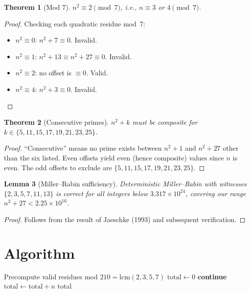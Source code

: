 \documentclass[12pt]{article}
\newtheorem{theorem}{Theorem}
\newtheorem{lemma}[theorem]{Lemma}
\begin{document}
\begin{theorem}[Mod 7]
$n^2 \equiv 2 \pmod{7}$, i.e., $n \equiv 3$ or $4 \pmod{7}$.
\end{theorem}

\begin{proof}
Checking each quadratic residue mod~7:
\begin{itemize}
\item $n^2 \equiv 0$: $n^2+7 \equiv 0$. Invalid.
\item $n^2 \equiv 1$: $n^2+13 \equiv n^2+27 \equiv 0$. Invalid.
\item $n^2 \equiv 2$: no offset is $\equiv 0$. Valid.
\item $n^2 \equiv 4$: $n^2+3 \equiv 0$. Invalid.
\end{itemize}
\end{proof}

\begin{theorem}[Consecutive primes]
$n^2+k$ must be composite for $k \in \{5,11,15,17,19,21,23,25\}$.
\end{theorem}

\begin{proof}
``Consecutive'' means no prime exists between $n^2+1$ and $n^2+27$ other than the six listed. Even offsets yield even (hence composite) values since $n$ is even. The odd offsets to exclude are $\{5,11,15,17,19,21,23,25\}$.
\end{proof}

\begin{lemma}[Miller--Rabin sufficiency]
Deterministic Miller--Rabin with witnesses $\{2,3,5,7,11,13\}$ is correct for all integers below $3.317 \times 10^{24}$, covering our range $n^2+27 < 2.25 \times 10^{16}$.
\end{lemma}

\begin{proof}
Follows from the result of Jaeschke (1993) and subsequent verification.
\end{proof}

\section{Algorithm}

\begin{algorithmic}[1]
\State Precompute valid residues mod $210 = \mathrm{lcm}(2,3,5,7)$
\State $\text{total} \gets 0$
         \textbf{continue} \EndIf
                \State $\text{total} \gets \text{total} + n$
            \EndIf
        \EndIf
    \EndFor
\EndFor
\State \Return total
\end{algorithmic}
\end{document}

